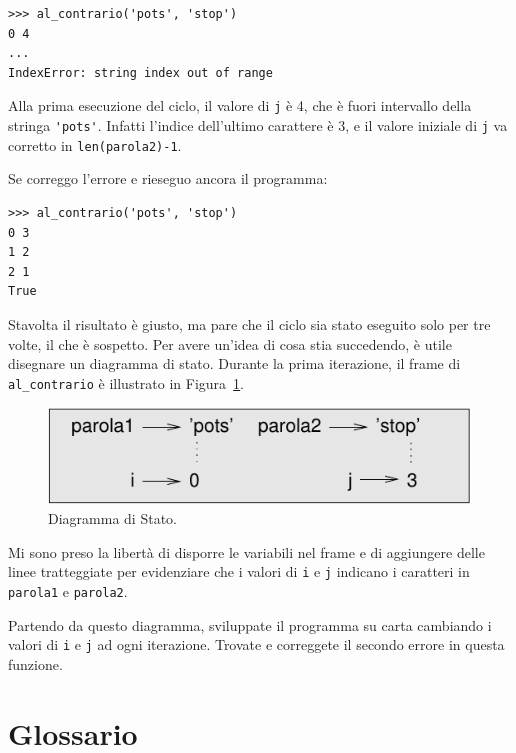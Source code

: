 \documentclass[10pt]{book}
\begin{document}
\begin{verbatim}
>>> al_contrario('pots', 'stop')
0 4
...
IndexError: string index out of range
\end{verbatim}
%
Alla prima esecuzione del ciclo, il valore di {\tt j} è 4,
che è fuori intervallo della stringa \verb"'pots'".
Infatti l'indice dell'ultimo carattere è 3, e il valore iniziale di {\tt j} va corretto in {\tt len(parola2)-1}.

Se correggo l'errore e rieseguo ancora il programma:

\begin{verbatim}
>>> al_contrario('pots', 'stop')
0 3
1 2
2 1
True
\end{verbatim}
%
Stavolta il risultato è giusto, ma pare che il ciclo sia stato eseguito solo per tre volte, il che è sospetto. Per avere un'idea di cosa stia succedendo, è utile disegnare un diagramma di stato. Durante la prima iterazione, il frame di \verb"al_contrario" è illustrato in Figura~\ref{fig.state4}.

\begin{figure}
\centerline
{\includegraphics[scale=0.8]{figs/state4.pdf}}
\caption{Diagramma di Stato.}
\label{fig.state4}
\end{figure}

Mi sono preso la libertà di disporre le variabili nel frame e di aggiungere delle linee tratteggiate per evidenziare che i valori di {\tt i} e
{\tt j} indicano i caratteri in {\tt parola1} e {\tt parola2}.

Partendo da questo diagramma, sviluppate il programma su carta cambiando i valori di {\tt i} e {\tt j} ad ogni iterazione. Trovate e correggete il secondo errore in questa funzione.
\label{isreverse}


\section{Glossario}
\end{document}
